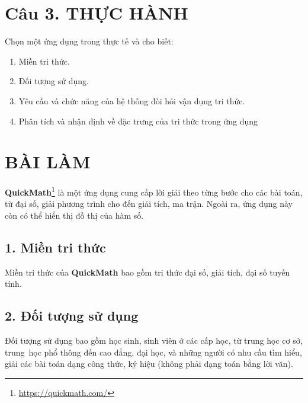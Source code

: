 \documentclass[a4paper]{article}
\begin{document}
\section*{Câu 3. THỰC HÀNH}	
Chọn một ứng dụng trong thực tế và cho biết:

\begin{enumerate} 
	\item Miền tri thức. 
	\item Đối tượng sử dụng. 
	\item Yêu cầu và chức năng của hệ thống đòi hỏi vận dụng tri thức. 
	\item Phân tích và nhận định về đặc trưng của tri thức trong ứng dụng
\end{enumerate}


\section*{BÀI LÀM}
\textbf{QuickMath}\footnote{\url{https://quickmath.com/}} là một ứng dụng cung cấp lời giải theo từng bước cho các bài toán, từ đại số, giải phương trình cho đến giải tích, ma trận. Ngoài ra, ứng dụng này còn có thể hiển thị đồ thị của hàm số.

\subsection* {1. Miền tri thức}
Miền tri thức của \textbf{QuickMath} bao gồm tri thức đại số, giải tích, đại số tuyến tính.

\subsection*{2. Đối tượng sử dụng}
Đối tượng sử dụng bao gồm học sinh, sinh viên ở các cấp học, từ trung học cơ sở, trung~học phổ thông đến cao đẳng, đại học, và những người có nhu cầu tìm hiểu, giải các bài toán dạng công thức, ký hiệu (không phải dạng toán bằng lời văn).
\end{document}
